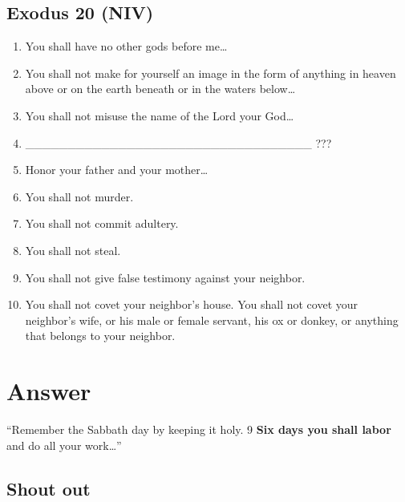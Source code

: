 \documentclass[
]{book}
\providecommand{\tightlist}{%
  \setlength{\itemsep}{0pt}\setlength{\parskip}{0pt}}
\begin{document}
\hypertarget{exodus-20-niv}{%
\section{Exodus 20 (NIV)}\label{exodus-20-niv}}

\begin{enumerate}
\def\labelenumi{\arabic{enumi}.}
\tightlist
\item
  You shall have no other gods before me\ldots{}
\item
  You shall not make for yourself an image in the form of anything in heaven above or on the earth beneath or in the waters below\ldots{}
\item
  You shall not misuse the name of the Lord your God\ldots{}
\item
  \_\_\_\_\_\_\_\_\_\_\_\_\_\_\_\_\_\_\_\_\_\_\_\_\_\_\_\_\_\_\_\_\_\_ ???
\item
  Honor your father and your mother\ldots{}
\item
  You shall not murder.
\item
  You shall not commit adultery.
\item
  You shall not steal.
\item
  You shall not give false testimony against your neighbor.
\item
  You shall not covet your neighbor's house. You shall not covet your neighbor's wife, or his male or female servant, his ox or donkey, or anything that belongs to your neighbor.
\end{enumerate}

\hypertarget{answer}{%
\chapter{Answer}\label{answer}}

``Remember the Sabbath day by keeping it holy. 9 \textbf{Six days you shall labor} and do all your work\ldots{}''

\hypertarget{shout-out}{%
\section{Shout out}\label{shout-out}}
\end{document}
